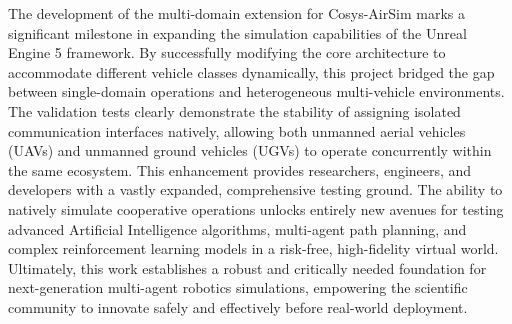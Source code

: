 The development of the multi-domain extension for Cosys-AirSim marks a significant milestone in expanding the simulation capabilities of the Unreal Engine 5 framework. By successfully modifying the core architecture to accommodate different vehicle classes dynamically, this project bridged the gap between single-domain operations and heterogeneous multi-vehicle environments. 
The validation tests clearly demonstrate the stability of assigning isolated communication interfaces natively, allowing both unmanned aerial vehicles (UAVs) and unmanned ground vehicles (UGVs) to operate concurrently within the same ecosystem.\newline
This enhancement provides researchers, engineers, and developers with a vastly expanded, comprehensive testing ground. The ability to natively simulate cooperative operations unlocks entirely new avenues for testing advanced Artificial Intelligence algorithms, multi-agent path planning, and complex reinforcement learning models in a risk-free, high-fidelity virtual world. Ultimately, this work establishes a robust and critically needed foundation for next-generation multi-agent robotics simulations, empowering the scientific community to innovate safely and effectively before real-world deployment.